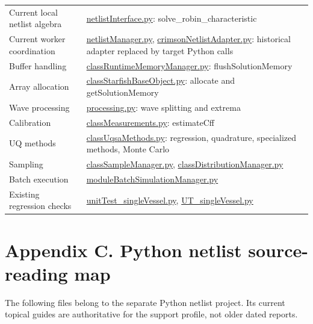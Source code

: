 \documentclass[11pt,a4paper]{article}
\begin{document}
\begin{longtable}{>{\raggedright\arraybackslash}p{}>{\raggedright\arraybackslash}p{}}
Current local netlist algebra & \href{/home/sadid/starfish/NetworkLib/netlistInterface.py}{netlistInterface.py}: solve\_robin\_characteristic \\
Current worker coordination & \href{/home/sadid/starfish/NetworkLib/netlistManager.py}{netlistManager.py}, \href{/home/sadid/starfish/UtilityLib/crimsonNetlistAdapter.py}{crimsonNetlistAdapter.py}: historical adapter replaced by target Python calls \\
Buffer handling & \href{/home/sadid/starfish/UtilityLib/classRuntimeMemoryManager.py}{classRuntimeMemoryManager.py}: flushSolutionMemory \\
Array allocation & \href{/home/sadid/starfish/UtilityLib/classStarfishBaseObject.py}{classStarfishBaseObject.py}: allocate and getSolutionMemory \\
Wave processing & \href{/home/sadid/starfish/UtilityLib/processing.py}{processing.py}: wave splitting and extrema \\
Calibration & \href{/home/sadid/starfish/NetworkLib/classMeasurements.py}{classMeasurements.py}: estimateCff \\
UQ methods & \href{/home/sadid/starfish/VascularPolynomialChaosLib/classUqsaMethods.py}{classUqsaMethods.py}: regression, quadrature, specialized methods, Monte Carlo \\
Sampling & \href{/home/sadid/starfish/VascularPolynomialChaosLib/classSampleManager.py}{classSampleManager.py}, \href{/home/sadid/starfish/VascularPolynomialChaosLib/classDistributionManager.py}{classDistributionManager.py} \\
Batch execution & \href{/home/sadid/starfish/VascularPolynomialChaosLib/moduleBatchSimulationManager.py}{moduleBatchSimulationManager.py} \\
Existing regression checks & \href{/home/sadid/starfish/UnitTesting/unitTest_singleVessel.py}{unitTest\_singleVessel.py}, \href{/home/sadid/starfish/UnitTesting/UT_singleVessel.py}{UT\_singleVessel.py} \\
\end{longtable}
\endgroup
\clearpage
\section{Appendix C. Python netlist source-reading map}
The following files belong to the separate Python netlist project. Its current topical guides are authoritative for the support profile, not older dated reports.
\end{document}
